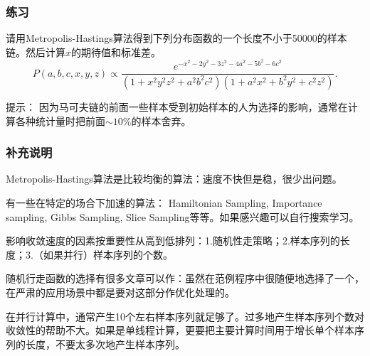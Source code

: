 \documentclass[CJK]{beamer}
\begin{document}
\begin{frame}
  \frametitle{练习}  
  请用Metropolis-Hastings算法得到下列分布函数的一个长度不小于50000的样本链。然后计算$x$的期待值和标准差。
{\small
  $$ P(a,b,c,x,y,z) \propto \frac{e^{-x^2-2y^2-3z^2-4a^2-5b^2-6c^2}}{(1+x^2y^2z^2+a^2b^2c^2)(1+a^2x^2+b^2y^2 + c^2z^2)}. $$}


\skiplines

提示：   因为马可夫链的前面一些样本受到初始样本的人为选择的影响，通常在计算各种统计量时把前面$\sim 10\%$的样本舍弃。  
\end{frame}  
  

\begin{frame}
  \frametitle{补充说明}
  {\small
  \bitem
  \item{Metropolis-Hastings算法是比较均衡的算法：速度不快但是稳，很少出问题。}
  \item{  有一些在特定的场合下加速的算法： Hamiltonian Sampling, Importance sampling, Gibbs Sampling, Slice Sampling等等。如果感兴趣可以自行搜索学习。}
  \item{影响收敛速度的因素按重要性从高到低排列：1.随机性走策略；2.样本序列的长度；3.（如果并行）样本序列的个数。}    
  \item{随机行走函数的选择有很多文章可以作：虽然在范例程序中很随便地选择了一个，在严肃的应用场景中都是要对这部分作优化处理的。}
  \item{在并行计算中，通常产生10个左右样本序列就足够了。过多地产生样本序列个数对收敛性的帮助不大。如果是单线程计算，更要把主要计算时间用于增长单个样本序列的长度，不要太多次地产生样本序列。}

    \eitem
    }
  
\end{frame}  

  
  \ech
\end{document}
